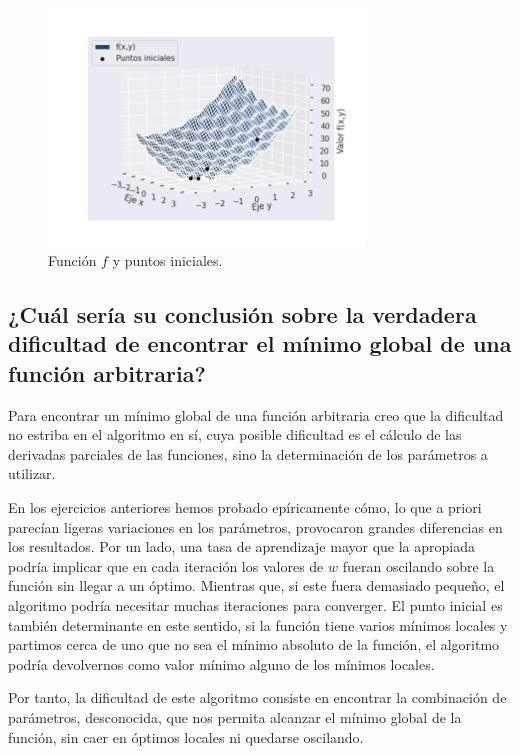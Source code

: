 \documentclass[a4paper, 20pt]{article}
\begin{document}
\begin{figure}[H]
    \centering
    \includegraphics[width=0.75\textwidth]{f1+pts}
    \caption{Función $f$ y puntos iniciales.}
    \label{fig:f1+pts}
\end{figure}


\subsection{¿Cuál sería su conclusión sobre la verdadera dificultad de encontrar el mínimo
global de una función arbitraria?}

Para encontrar un mínimo global de una función arbitraria creo que la dificultad no estriba en el algoritmo en sí, cuya posible dificultad es el cálculo de las derivadas parciales de las funciones, sino la determinación de los parámetros a utilizar.

En los ejercicios anteriores hemos probado epíricamente cómo, lo que a priori parecían ligeras variaciones en los parámetros, provocaron grandes diferencias en los resultados. Por un lado,  una tasa de aprendizaje mayor que la apropiada podría implicar que en cada iteración los valores de $w$ fueran oscilando sobre la función sin llegar a un óptimo. Mientras que, si este fuera demasiado pequeño, el algoritmo podría necesitar muchas iteraciones para converger. El punto inicial es también determinante en este sentido, si la función tiene varios mínimos locales y partimos cerca de uno que no sea el mínimo absoluto de la función, el algoritmo podría devolvernos como valor mínimo alguno de los mínimos locales.

Por tanto, la dificultad de este algoritmo consiste en encontrar la combinación de parámetros, desconocida, que nos permita alcanzar el mínimo global de la función, sin caer en óptimos locales ni quedarse oscilando.
\newpage
\end{document}
